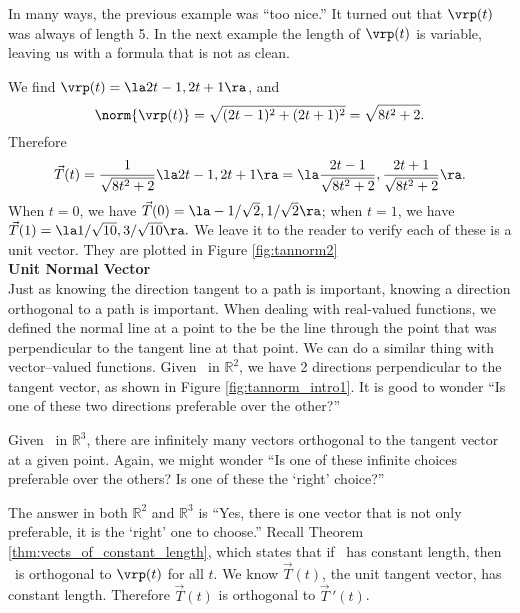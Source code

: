 In many ways, the previous example was ``too nice.'' It turned out that $\vrp(t)$ was always of length 5. In the next example the length of $\vrp(t)$ is variable, leaving us with a formula that is not as clean.\\
\pagebreak

{We find $\vrp(t) = \la 2t-1,2t+1\ra$, and 
\[
\norm{\vrp(t)} = \sqrt{(2t-1)^2+(2t+1)^2} = \sqrt{8t^2+2}.
\]
Therefore 
\[
\vec T(t) = \frac{1}{\sqrt{8t^2+2}}\la 2t-1,2t+1\ra = \la \frac{2t-1}{\sqrt{8t^2+2}},\frac{2t+1}{\sqrt{8t^2+2}}\ra.
\]
When $t=0$, we have $\vec T(0) = \la -1/\sqrt{2},1/\sqrt{2}\ra$; when $t=1$, we have $\vec T(1) = \la 1/\sqrt{10}, 3/\sqrt{10}\ra.$ We leave it to the reader to verify each of these is a unit vector. They are plotted in Figure \ref{fig:tannorm2}
}\\

\noindent\textbf{\large Unit Normal Vector}\\

Just as knowing the direction tangent to a path is important, knowing a direction orthogonal to a path is important. When dealing with real-valued functions, we defined the normal line at a point to the be the line through the point that was perpendicular to the tangent line at that point. We can do a similar thing with vector--valued functions. Given \vrt\ in $\mathbb{R}^2$, we have 2 directions perpendicular to the tangent vector, as shown in Figure \ref{fig:tannorm_intro1}. It is good to wonder ``Is one of these two directions preferable over the other?''

Given \vrt\ in $\mathbb{R}^3$,  there are infinitely many vectors orthogonal to the tangent vector at a given point. Again, we might wonder ``Is one of these infinite choices preferable over the others? Is one of these the `right' choice?''

The answer in both $\mathbb{R}^2$ and $\mathbb{R}^3$ is ``Yes, there is one vector that is not only preferable, it is the `right' one to choose.'' Recall Theorem \ref{thm:vects_of_constant_length}, which states that if \vrt\ has constant length, then \vrt\ is orthogonal to $\vrp(t)$ for all $t$. We know $\vec T(t)$, the unit tangent vector, has constant length. Therefore $\vec T(t)$ is orthogonal to $\vec T\,'(t)$.

